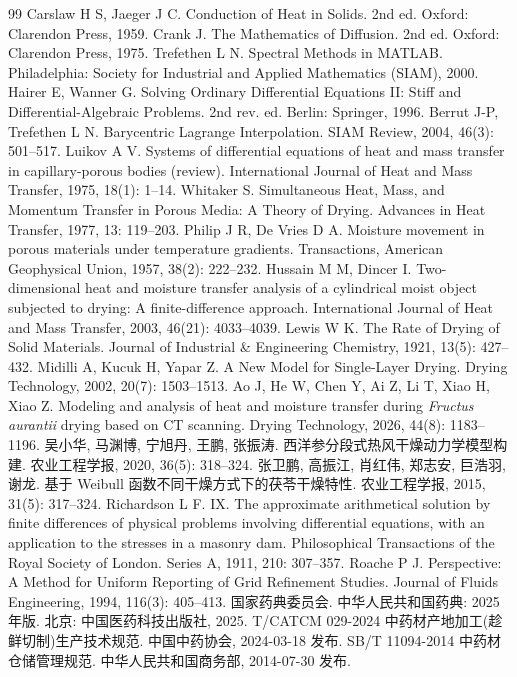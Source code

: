 \documentclass[bwprint]{cumcmthesis}
\begin{document}
\begin{thebibliography}{99}
 Carslaw H S, Jaeger J C. Conduction of Heat in Solids. 2nd ed.
Oxford: Clarendon Press, 1959.
 Crank J. The Mathematics of Diffusion. 2nd ed.
Oxford: Clarendon Press, 1975.
 Trefethen L N. Spectral Methods in MATLAB.
Philadelphia: Society for Industrial and Applied Mathematics (SIAM), 2000.
 Hairer E, Wanner G. Solving Ordinary Differential Equations II:
Stiff and Differential-Algebraic Problems. 2nd rev. ed. Berlin: Springer, 1996.
 Berrut J-P, Trefethen L N. Barycentric Lagrange Interpolation.
SIAM Review, 2004, 46(3): 501--517.
 Luikov A V. Systems of differential equations of heat and mass transfer
in capillary-porous bodies (review). International Journal of Heat and Mass Transfer,
1975, 18(1): 1--14.
 Whitaker S. Simultaneous Heat, Mass, and Momentum Transfer in Porous
Media: A Theory of Drying. Advances in Heat Transfer, 1977, 13: 119--203.
 Philip J R, De Vries D A. Moisture movement in porous materials under
temperature gradients. Transactions, American Geophysical Union, 1957, 38(2): 222--232.
 Hussain M M, Dincer I. Two-dimensional heat and moisture transfer
analysis of a cylindrical moist object subjected to drying: A finite-difference approach.
International Journal of Heat and Mass Transfer, 2003, 46(21): 4033--4039.
 Lewis W K. The Rate of Drying of Solid Materials.
Journal of Industrial \& Engineering Chemistry, 1921, 13(5): 427--432.
 Midilli A, Kucuk H, Yapar Z. A New Model for Single-Layer Drying.
Drying Technology, 2002, 20(7): 1503--1513.
 Ao J, He W, Chen Y, Ai Z, Li T, Xiao H, Xiao Z. Modeling and analysis of
heat and moisture transfer during \emph{Fructus aurantii} drying based on CT scanning.
Drying Technology, 2026, 44(8): 1183--1196.
 吴小华, 马渊博, 宁旭丹, 王鹏, 张振涛. 西洋参分段式热风干燥动力学模型构建.
农业工程学报, 2020, 36(5): 318--324.
 张卫鹏, 高振江, 肖红伟, 郑志安, 巨浩羽, 谢龙.
基于 Weibull 函数不同干燥方式下的茯苓干燥特性. 农业工程学报, 2015, 31(5): 317--324.
 Richardson L F. IX. The approximate arithmetical solution by finite
differences of physical problems involving differential equations, with an application to
the stresses in a masonry dam. Philosophical Transactions of the Royal Society of London.
Series A, 1911, 210: 307--357.
 Roache P J. Perspective: A Method for Uniform Reporting of Grid
Refinement Studies. Journal of Fluids Engineering, 1994, 116(3): 405--413.
 国家药典委员会. 中华人民共和国药典: 2025 年版. 北京: 中国医药科技出版社, 2025.
 T/CATCM 029-2024 中药材产地加工(趁鲜切制)生产技术规范.
中国中药协会, 2024-03-18 发布.
 SB/T 11094-2014 中药材仓储管理规范. 中华人民共和国商务部, 2014-07-30 发布.
\end{thebibliography}
\end{document}
